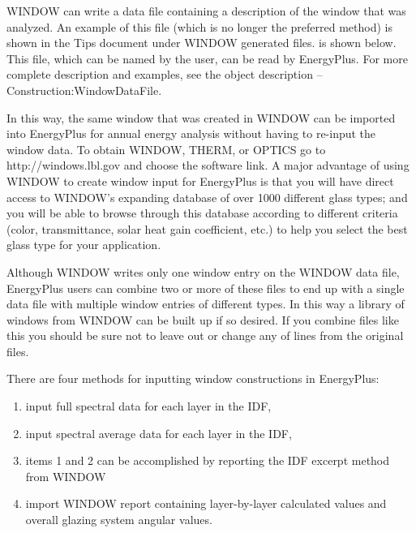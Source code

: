 WINDOW can write a data file containing a description of the window that was analyzed. An example of this file (which is no longer the preferred method) is shown in the Tips document under WINDOW generated files. is shown below. This file, which can be named by the user, can be read by EnergyPlus. For more complete description and examples, see the object description -- Construction:WindowDataFile.

In this way, the same window that was created in WINDOW can be imported into EnergyPlus for annual energy analysis without having to re-input the window data. To obtain WINDOW, THERM, or OPTICS go to http://windows.lbl.gov and choose the software link. A major advantage of using WINDOW to create window input for EnergyPlus is that you will have direct access to WINDOW's expanding database of over 1000 different glass types; and you will be able to browse through this database according to different criteria (color, transmittance, solar heat gain coefficient, etc.) to help you select the best glass type for your application.

Although WINDOW writes only one window entry on the WINDOW data file, EnergyPlus users can combine two or more of these files to end up with a single data file with multiple window entries of different types. In this way a library of windows from WINDOW can be built up if so desired. If you combine files like this you should be sure not to leave out or change any of lines from the original files.

There are four methods for inputting window constructions in EnergyPlus:

\begin{enumerate}
\tightlist
\item
  input full spectral data for each layer in the IDF,
\item
  input spectral average data for each layer in the IDF,
\item
  items 1 and 2 can be accomplished by reporting the IDF excerpt method from WINDOW
\item
  import WINDOW report containing layer-by-layer calculated values and overall glazing system angular values.
\end{enumerate}

\begin{callout}
\end{callout}

